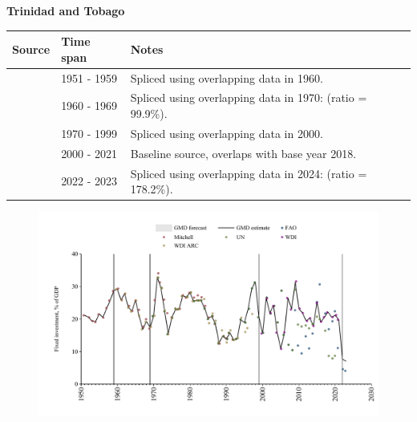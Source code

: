 \documentclass[12pt,a4paper,landscape]{article}
\begin{document}
\begin{adjustbox}{max totalsize={\paperwidth}{\paperheight},center}
\begin{minipage}[t][\textheight][t]{\textwidth}
\vspace*{0.5cm}
{}
\begin{center}
{\Large\bfseries Trinidad and Tobago}
\end{center}
\vspace{0.5cm}
\begin{table}[H]
\centering
\small
\begin{tabular}{|l|l|l|}
\hline
\textbf{Source} & \textbf{Time span} & \textbf{Notes} \\
\hline
\rowcolor{white}\cite{Mitchell}& 1951 - 1959 &Spliced using overlapping data in 1960.\\
\rowcolor{lightgray}\cite{WDI_ARC}& 1960 - 1969 &Spliced using overlapping data in 1970: (ratio = 99.9\%).\\
\rowcolor{white}\cite{UN}& 1970 - 1999 &Spliced using overlapping data in 2000.\\
\rowcolor{lightgray}\cite{WDI}& 2000 - 2021 &Baseline source, overlaps with base year 2018.\\
\rowcolor{white}\cite{FAO}& 2022 - 2023 &Spliced using overlapping data in 2024: (ratio = 178.2\%).\\
\hline
\end{tabular}
\end{table}
\begin{figure}[H]
\centering
\includegraphics[width=\textwidth,height=0.6\textheight,keepaspectratio]{graphs/TTO_finv_GDP.pdf}
\end{figure}
\end{minipage}
\end{adjustbox}
\end{document}
